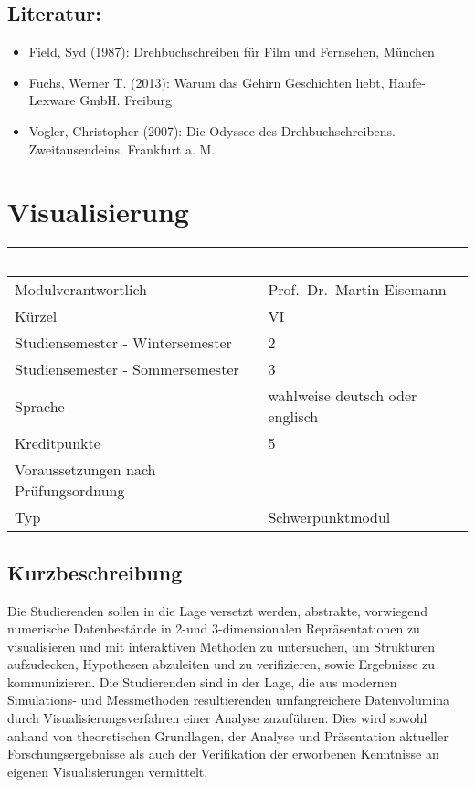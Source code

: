 \section*{Literatur:}\label{literatur-14}

\begin{itemize}
\item
  Field, Syd (1987): Drehbuchschreiben für Film und Fernsehen, München
\item
  Fuchs, Werner T. (2013): Warum das Gehirn Geschichten liebt,
  Haufe-Lexware GmbH. Freiburg
\item
  Vogler, Christopher (2007): Die Odyssee des Drehbuchschreibens.
  Zweitausendeins. Frankfurt a. M.
\end{itemize}

\chapter{Visualisierung}\label{visualisierung}

\begin{longtable}[]{@{}ll@{}}
\toprule
~ & ~\tabularnewline
\midrule
\endhead
Modulverantwortlich & Prof.~Dr.~Martin Eisemann\tabularnewline
Kürzel & VI\tabularnewline
Studiensemester - Wintersemester & 2\tabularnewline
Studiensemester - Sommersemester & 3\tabularnewline
Sprache & wahlweise deutsch oder englisch\tabularnewline
Kreditpunkte & 5\tabularnewline
Voraussetzungen nach Prüfungsordnung & ~\tabularnewline
Typ & Schwerpunktmodul\tabularnewline
\bottomrule
\end{longtable}

\section*{Kurzbeschreibung}\label{kurzbeschreibung-9}

Die Studierenden sollen in die Lage versetzt werden, abstrakte,
vorwiegend numerische Datenbestände in 2-und 3-dimensionalen
Repräsentationen zu visualisieren und mit interaktiven Methoden zu
untersuchen, um Strukturen aufzudecken, Hypothesen abzuleiten und zu
verifizieren, sowie Ergebnisse zu kommunizieren. Die Studierenden sind
in der Lage, die aus modernen Simulations- und Messmethoden
resultierenden umfangreichere Datenvolumina durch
Visualisierungsverfahren einer Analyse zuzuführen. Dies wird sowohl
anhand von theoretischen Grundlagen, der Analyse und Präsentation
aktueller Forschungsergebnisse als auch der Verifikation der erworbenen
Kenntnisse an eigenen Visualisierungen vermittelt.


